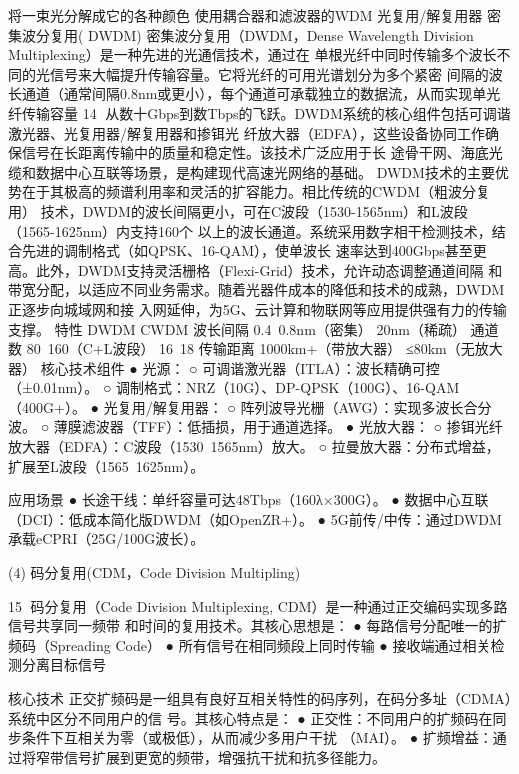 将一束光分解成它的各种颜色           使用耦合器和滤波器的WDM             光复用/解复用器
密集波分复用( DWDM)
密集波分复用（DWDM，Dense Wavelength Division Multiplexing）是一种先进的光通信技术，通过在
单根光纤中同时传输多个波长不同的光信号来大幅提升传输容量。它将光纤的可用光谱划分为多个紧密
间隔的波长通道（通常间隔0.8nm或更小），每个通道可承载独立的数据流，从而实现单光纤传输容量
                                                                14
从数十Gbps到数Tbps的飞跃。DWDM系统的核心组件包括可调谐激光器、光复用器/解复用器和掺铒光
纤放大器（EDFA），这些设备协同工作确保信号在长距离传输中的质量和稳定性。该技术广泛应用于长
途骨干网、海底光缆和数据中心互联等场景，是构建现代高速光网络的基础。
DWDM技术的主要优势在于其极高的频谱利用率和灵活的扩容能力。相比传统的CWDM（粗波分复用）
技术，DWDM的波长间隔更小，可在C波段（1530-1565nm）和L波段（1565-1625nm）内支持160个
以上的波长通道。系统采用数字相干检测技术，结合先进的调制格式（如QPSK、16-QAM），使单波长
速率达到400Gbps甚至更高。此外，DWDM支持灵活栅格（Flexi-Grid）技术，允许动态调整通道间隔
和带宽分配，以适应不同业务需求。随着光器件成本的降低和技术的成熟，DWDM正逐步向城域网和接
入网延伸，为5G、云计算和物联网等应用提供强有力的传输支撑。
 特性                 DWDM                CWDM
 波长间隔               0.4~0.8nm（密集）       20nm（稀疏）
 通道数                80~160（C+L波段）       16~18
 传输距离               1000km+（带放大器）       ≤80km（无放大器）
核心技术组件
 ● 光源：
    ○ 可调谐激光器（ITLA）：波长精确可控（±0.01nm）。
    ○ 调制格式：NRZ（10G）、DP-QPSK（100G）、16-QAM（400G+）。
 ● 光复用/解复用器：
    ○ 阵列波导光栅（AWG）：实现多波长合分波。
    ○ 薄膜滤波器（TFF）：低插损，用于通道选择。
 ● 光放大器：
    ○ 掺铒光纤放大器（EDFA）：C波段（1530~1565nm）放大。
    ○ 拉曼放大器：分布式增益，扩展至L波段（1565~1625nm）。

应用场景
 ● 长途干线：单纤容量可达48Tbps（160λ×300G）。
 ● 数据中心互联（DCI）：低成本简化版DWDM（如OpenZR+）。
 ● 5G前传/中传：通过DWDM承载eCPRI（25G/100G波长）。



(4) 码分复用(CDM，Code Division Multipling)

                                                       15
码分复用（Code Division Multiplexing, CDM）是一种通过正交编码实现多路信号共享同一频带
和时间的复用技术。其核心思想是：
 ● 每路信号分配唯一的扩频码（Spreading Code）
 ● 所有信号在相同频段上同时传输
 ● 接收端通过相关检测分离目标信号


核心技术
正交扩频码是一组具有良好互相关特性的码序列，在码分多址（CDMA）系统中区分不同用户的信
号。其核心特点是：
 ● 正交性：不同用户的扩频码在同步条件下互相关为零（或极低），从而减少多用户干扰
   （MAI）。
 ● 扩频增益：通过将窄带信号扩展到更宽的频带，增强抗干扰和抗多径能力。





